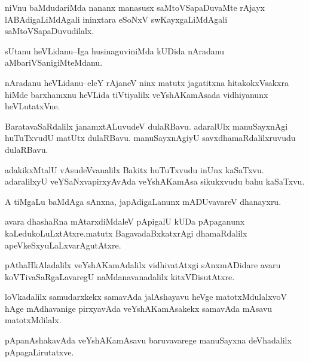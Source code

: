 \documentclass{article}
\begin{document}
\begin{mn}%
niVnu baMdudariMda nananx manasusx saMtoVSapaDuvaMte rAjayx lABAdigaLiMdAgali ininxtara 
eSoNxV swKayxgaLiMdAgali saMtoVSapaDuvudilalx.
\end{mn}

\begin{mn}%
sUtanu heVLidanu--Iga husinaguviniMda kUDida nAradanu aMbariVSanigiMteMdanu.
\end{mn}

\begin{mn}%
nAradanu heVLidanu--eleY rAjaneV ninx matutx jagatitxna hitakokxVsakxra hiMde barxhamxnu 
heVLida tiVtiyalilx veYshAKamAsada vidhiyanunx heVLutatxVne.
\end{mn}

\begin{mn}%
BaratavaSaRdalilx janamxtALuvudeV dulaRBavu. adaralUlx manuSayxnAgi huTuTxvudU matUtx 
dulaRBavu. manuSayxnAgiyU savxdhamaRdalilxruvudu dulaRBavu.
\end{mn}

\begin{mn}%
adakikxMtalU vAsudeVvanalilx Bakitx huTuTxvudu inUnx kaSaTxvu. adaralilxyU 
veYSaNxvapirxyAvAda veYshAKamAsa sikukxvudu bahu kaSaTxvu.
\end{mn}

\begin{mn}%
A tiMgaLu baMdAga sAnxna, japAdigaLanunx mADUvavareV dhanayxru. 
\end{mn}

\begin{mn}%
avara dhashaRna mAtarxdiMdaleV pApigalU kUDa pApaganunx kaLedukoLuLxtAtxre.matutx 
BagavadaBxkatxrAgi dhamaRdalilx apeVkeSxyuLaLxvarAgutAtxre.
\end{mn}

\begin{mn}%
pAthaHkAladalilx veYshAKamAdalilx vidhivatAtxgi sAnxmADidare avaru koVTivaSaRgaLavaregU 
naMdanavanadalilx kitxVDisutAtxre.
\end{mn}

\begin{mn}%
loVkadalilx samudarxkekx samavAda jalAshayavu heVge matotxMdulalxvoV hAge mAdhavanige 
pirxyavAda veYshAKamAsakekx samavAda mAsavu matotxMdilalx.
\end{mn}

\begin{mn}%
pApanAshakavAda veYshAKamAsavu baruvavarege manuSayxna deVhadalilx pApagaLirutatxve.
\end{mn}
\end{document}
